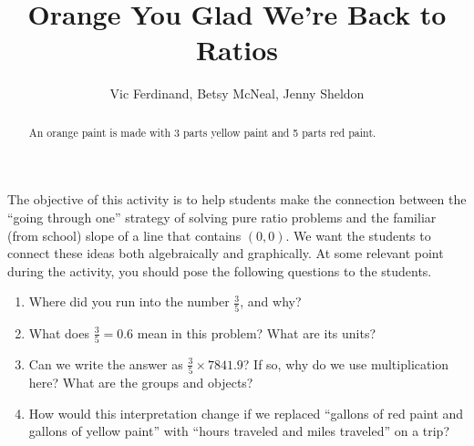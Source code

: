 \documentclass[nooutcomes, handout]{ximera}
\title{Orange You Glad We're Back to Ratios}
\author{Vic Ferdinand, Betsy McNeal, Jenny Sheldon}
\begin{document}
\begin{abstract}
An orange paint is made with 3 parts yellow paint and 5 parts red paint. 
\end{abstract}
\maketitle

\begin{instructorIntro}
The objective of this activity is to help students make the connection between the ``going through one'' strategy of solving pure ratio problems and the familiar (from school) slope of a line that contains $(0, 0)$.  We want the students to connect these ideas both algebraically and graphically.  At some relevant point during the activity, you should pose the following questions to the students.


\begin{enumerate}
    \item Where did you run into the number $\frac35$, and why?      
    \item What does $\frac35 = 0.6$ mean in this problem?  What are its units?     
    \item Can we write the answer as $\frac35 \times 7841.9$? If so, why do we use multiplication here?  What are the groups and objects?  
    \item How would this interpretation change if we replaced ``gallons of red paint and gallons of yellow paint'' with ``hours traveled and miles traveled'' on a trip?
\end{enumerate}
\end{instructorIntro}
\end{document}
